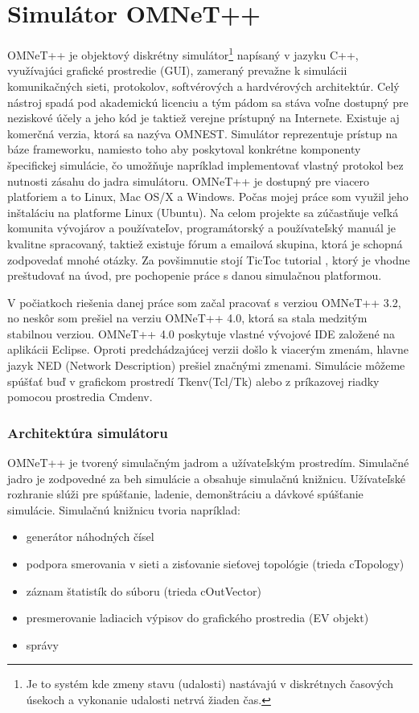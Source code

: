 \documentclass[11pt,twoside,a4paper]{book}
\begin{document}
\chapter{Simulátor OMNeT++}
OMNeT++ je objektový diskrétny simulátor\footnote{Je to systém kde zmeny stavu (udalosti) nastávajú v diskrétnych časových úsekoch a vykonanie udalosti netrvá žiaden čas.} napísaný v jazyku C++, využívajúci grafické prostredie (GUI), zameraný prevažne k simulácii komunikačných sieti, protokolov, softvérových a hardvérových architektúr. Celý nástroj spadá pod akademickú licenciu a tým pádom sa stáva voľne dostupný pre neziskové účely a jeho kód je taktiež verejne prístupný na Internete. Existuje aj komerčná verzia, ktorá sa nazýva OMNEST. Simulátor reprezentuje prístup na báze frameworku, namiesto toho aby poskytoval konkrétne komponenty špecifickej simulácie, čo umožňuje napríklad implementovať vlastný protokol bez nutnosti zásahu do jadra simulátoru. OMNeT++ je dostupný pre viacero platforiem a to Linux, Mac OS/X a Windows. Počas mojej práce som využil jeho inštaláciu na platforme Linux (Ubuntu). Na celom projekte sa zúčastňuje veľká komunita vývojárov a používateľov, programátorský a používateľský manuál \cite{OmnetApi}\cite{OmnetUser} je kvalitne spracovaný, taktiež existuje fórum a emailová skupina, ktorá je schopná zodpovedať mnohé otázky. Za povšimnutie stojí TicToc tutorial \cite{TicToc}, ktorý je vhodne preštudovať na úvod, pre pochopenie práce s danou simulačnou platformou.

V počiatkoch riešenia danej práce som začal pracovať s verziou OMNeT++ 3.2, no neskôr som prešiel na verziu OMNeT++ 4.0, ktorá sa stala medzitým stabilnou verziou. OMNeT++ 4.0 poskytuje vlastné vývojové IDE založené na aplikácii Eclipse. Oproti predchádzajúcej verzii došlo k viacerým zmenám, hlavne jazyk NED (Network Description) prešiel značnými zmenami. Simulácie môžeme spúšťať buď v grafickom prostredí Tkenv(Tcl/Tk) alebo z príkazovej riadky pomocou prostredia Cmdenv.

\subsection{Architektúra simulátoru}
OMNeT++ je tvorený simulačným jadrom a užívateľským prostredím. Simulačné jadro je zodpovedné za beh simulácie a obsahuje simulačnú knižnicu. Užívateľské rozhranie slúži pre spúšťanie, ladenie, demonštráciu a dávkové spúšťanie simulácie. Simulačnú knižnicu tvoria napríklad:
\begin{itemize}
\item generátor náhodných čísel
\item podpora smerovania v sieti a zisťovanie sieťovej topológie (trieda cTopology)
\item záznam štatistík do súboru (trieda cOutVector)
\item presmerovanie ladiacich výpisov do grafického prostredia (EV objekt)
\item správy
\end{itemize}
\end{document}
